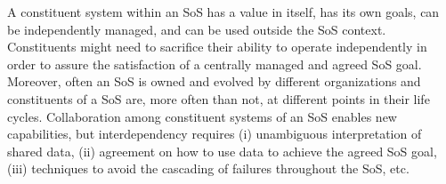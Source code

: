 
A constituent system within an SoS has a value in itself, has its own goals, can be independently managed, and can be used outside the SoS context. Constituents might need to sacrifice their ability to operate independently in order to assure the satisfaction of a centrally managed and agreed SoS goal. Moreover, often an SoS is owned and evolved by different organizations and constituents of a SoS are, more often than not, at different points in their life cycles. Collaboration among constituent systems of an SoS enables new capabilities, but interdependency requires (i) unambiguous interpretation of shared data, (ii) agreement on how to use data to achieve the agreed SoS goal, (iii) techniques to avoid the cascading of failures throughout the SoS, etc. %

